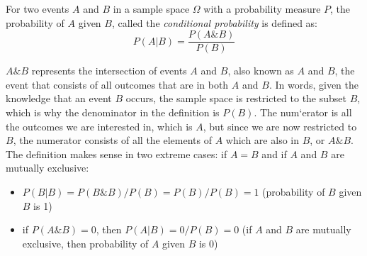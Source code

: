 \documentclass[
  letterpaper,
  DIV=11,
  numbers=noendperiod]{scrreprt}
\providecommand{\tightlist}{%
  \setlength{\itemsep}{0pt}\setlength{\parskip}{0pt}}\usepackage{longtable,booktabs,array}
\begin{document}
\begin{tcolorbox}[enhanced jigsaw, arc=.35mm, colframe=quarto-callout-note-color-frame, left=2mm, opacitybacktitle=0.6, breakable, title=\textcolor{quarto-callout-note-color}{\faInfo}\hspace{0.5em}{Definition}, toprule=.15mm, coltitle=black, bottomtitle=1mm, toptitle=1mm, colback=white, leftrule=.75mm, colbacktitle=quarto-callout-note-color!10!white, titlerule=0mm, opacityback=0, rightrule=.15mm, bottomrule=.15mm]

For two events \(A\) and \(B\) in a sample space \(\Omega\) with a
probability measure \(P\), the probability of \(A\) given \(B\), called
the \emph{conditional probability} is defined as:
\[P(A|B) = \frac{P(A\& B)}{P(B)}\]

\end{tcolorbox}

\(A \& B\) represents the intersection of events \(A\) and \(B\), also
known as \(A\) and \(B\), the event that consists of all outcomes that
are in both \(A\) and \(B\). In words, given the knowledge that an event
\(B\) occurs, the sample space is restricted to the subset \(B\), which
is why the denominator in the definition is \(P(B)\). The num`erator is
all the outcomes we are interested in, which is \(A\), but since we are
now restricted to \(B\), the numerator consists of all the elements of
\(A\) which are also in \(B\), or \(A \& B\). The definition makes sense
in two extreme cases: if \(A = B\) and if \(A\) and \(B\) are mutually
exclusive:

\begin{itemize}
\tightlist
\item
  \(P(B|B) = P(B \& B) /P(B) = P(B)/P(B) = 1\) (probability of \(B\)
  given \(B\) is 1)
\item
  if \(P(A\& B) =0\), then \(P(A|B) = 0/P(B) = 0\) (if \(A\) and \(B\)
  are mutually exclusive, then probability of \(A\) given \(B\) is 0)
\end{itemize}
\end{document}
